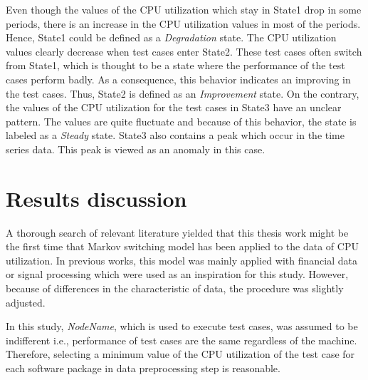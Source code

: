 Even though the values of the CPU utilization which stay in State1
drop in some periods, there is an increase in the CPU utilization
values in most of the periods. Hence, State1 could be defined as a
\emph{Degradation} state. The CPU utilization values clearly decrease
when test cases enter State2. These test cases often switch from State1,
which is thought to be a state where the performance of the test cases
perform badly. As a consequence, this behavior indicates an improving
in the test cases. Thus, State2 is defined as an \emph{Improvement}
state. On the contrary, the values of the CPU utilization for the
test cases in State3 have an unclear pattern. The values are quite
fluctuate and because of this behavior, the state is labeled as a
\emph{Steady} state. State3 also contains a peak which occur in the
time series data. This peak is viewed as an anomaly in this case. 

\section{Results discussion\label{sec:Results-discussion}}

A thorough search of relevant literature yielded that this thesis
work might be the first time that Markov switching model has been
applied to the data of CPU utilization. In previous works, this model
was mainly applied with financial data or signal processing which
were used as an inspiration for this study. However, because of differences
in the characteristic of data, the procedure was slightly adjusted.
\begin{comment}
A large amount of time was spent on understanding the data, examining
which variables had a significant impact on the CPU utilization, and
determining which methods would provide the best possible outcome
for this problem. Besides, after deciding on the most promising method,
a lot of effort was invested studying implemented algorithms in the
R package as well as modifying code as necessary. 
\end{comment}

In this study, \emph{NodeName}, which is used to execute test cases,
was assumed to be indifferent i.e., performance of test cases are
the same regardless of the machine. Therefore, selecting a minimum
value of the CPU utilization of the test case for each software package
in data preprocessing step is reasonable. 

